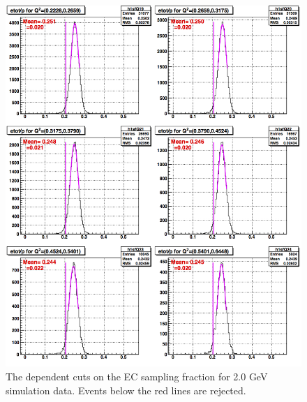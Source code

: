 \begin{figure}[H]%
\centering
\leavevmode \includegraphics[width=1.0\textwidth]{figuresEG4/FigCuts/ecCuts_sfOneD_Eb2_4ThsimN.png}  %
\caption[EC sampling fraction cut (Sim.)]{The \qsqs dependent cuts on the EC sampling fraction for 2.0 GeV simulation data. Events below the red lines are rejected.}
\label{ecSfSim6}
\end{figure}



